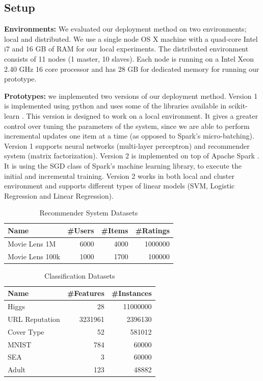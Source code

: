 \documentclass{vldb}
\begin{document}
\subsection{Setup}\label{subsec:setup}
\textbf{Environments:} We evaluated our deployment method on two environments; local and distributed.
We use a single node OS X machine with  a quad-core Intel i7 and 16 GB of RAM for our local experiments.
The distributed environment consists of 11 nodes (1 master, 10 slaves).
Each node is running on a Intel Xeon 2.40 GHz 16 core processor and has 28 GB for dedicated memory for running our prototype.

\textbf{Prototypes:} we implemented two versions of our deployment method.
Version 1 is implemented using python and uses some of the libraries available in scikit-learn \cite{sklearn_api}.
This version is designed to work on a local environment.
It gives a greater control over tuning the parameters of the system, since we are able to perform incremental updates one item at a time (as opposed to Spark's micro-batching).
Version 1 supports neural networks (multi-layer perceptron) and recommender system (matrix factorization).
Version 2 is implemented on top of Apache Spark \cite{zaharia2010spark}.
It is using the SGD class of Spark's machine learning library, to execute the initial and incremental training.
Version 2 works in both local and cluster environment and supports different types of linear models (SVM, Logistic Regression and Linear Regression).

\begin{table}\centering
\begin{tabular}{lrrr}
 \toprule
Name & \#Users & \#Items & \#Ratings
\\\midrule 
Movie Lens 1M  & 6000 & 4000 & 1000000 \\
Movie Lens 100k & 1000 & 1700 & 100000 
\\\bottomrule 
\end{tabular}
\caption{Recommender System Datasets}
\label{table:recommender-systems}
\end{table}

\begin{table}\centering
\begin{tabular}{lrr}
 \toprule
Name & \#Features  & \#Instances 
\\\midrule 
Higgs  & 28 & 11000000 \\
URL Reputation & 3231961 & 2396130 \\
Cover Type & 52 & 581012 \\
MNIST & 784 & 60000 \\
SEA & 3 & 60000 \\
Adult & 123 & 48882
\\\bottomrule 
\end{tabular}
\caption{Classification Datasets}
\end{table}
\end{document}
